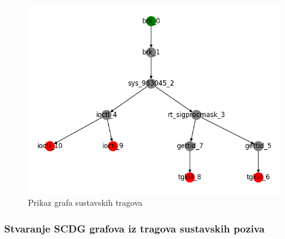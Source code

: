 \begin{figure}[htb]
    \centering
    \includegraphics[scale=0.75]{images/systrace_graph.png}
    \caption{Prikaz grafa sustavskih tragova}
    \label{fig:systrace_tree}
\end{figure}



\subsubsection{Stvaranje SCDG grafova iz tragova sustavskih poziva}


